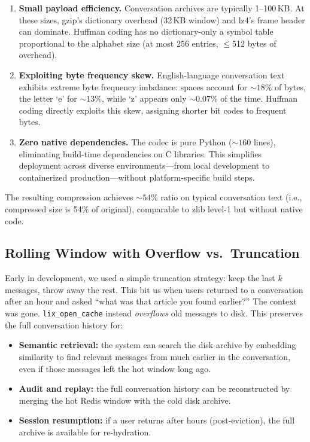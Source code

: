 \documentclass[conference]{IEEEtran}
\begin{document}
\begin{enumerate}
\item \textbf{Small payload efficiency.} Conversation archives are typically 1--100\,KB. At these sizes, gzip's dictionary overhead (32\,KB window) and lz4's frame header can dominate. Huffman coding has no dictionary-only a symbol table proportional to the alphabet size (at most 256 entries, $\leq$512 bytes of overhead).

\item \textbf{Exploiting byte frequency skew.} English-language conversation text exhibits extreme byte frequency imbalance: spaces account for ${\sim}18\%$ of bytes, the letter `e' for ${\sim}13\%$, while `z' appears only ${\sim}0.07\%$ of the time. Huffman coding directly exploits this skew, assigning shorter bit codes to frequent bytes.

\item \textbf{Zero native dependencies.} The codec is pure Python (${\sim}160$ lines), eliminating build-time dependencies on C libraries. This simplifies deployment across diverse environments---from local development to containerized production---without platform-specific build steps.
\end{enumerate}

The resulting compression achieves ${\sim}54\%$ ratio on typical conversation text (i.e., compressed size is 54\% of original), comparable to zlib level-1 but without native code.

\subsection{Rolling Window with Overflow vs.\ Truncation}

Early in development, we used a simple truncation strategy: keep the last $k$ messages, throw away the rest. This bit us when users returned to a conversation after an hour and asked ``what was that article you found earlier?'' The context was gone. \texttt{lix\_open\_cache} instead \emph{overflows} old messages to disk. This preserves the full conversation history for:

\begin{itemize}
\item \textbf{Semantic retrieval:} the system can search the disk archive by embedding similarity to find relevant messages from much earlier in the conversation, even if those messages left the hot window long ago.
\item \textbf{Audit and replay:} the full conversation history can be reconstructed by merging the hot Redis window with the cold disk archive.
\item \textbf{Session resumption:} if a user returns after hours (post-eviction), the full archive is available for re-hydration.
\end{itemize}
\end{document}
